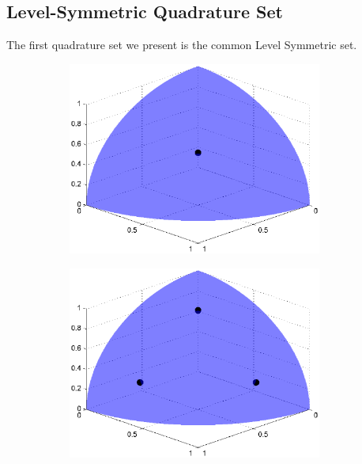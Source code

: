 \subsection{Level-Symmetric Quadrature Set}
\label{sec::Sn_Angle_LS}

The first quadrature set we present is the common Level Symmetric set.

\begin{figure}
\centering
	\begin{subfigure}[b]{0.48\textwidth}
		\centering
		\includegraphics[width=0.92\textwidth]{figures/sec_Sn/LS2.eps}
		\caption{}
	\end{subfigure}
	\hfill
	\begin{subfigure}[b]{0.48\textwidth}
		\centering
		\includegraphics[width=0.92\textwidth]{figures/sec_Sn/LS4.eps}
		\caption{}
	\end{subfigure}

\end{figure}
